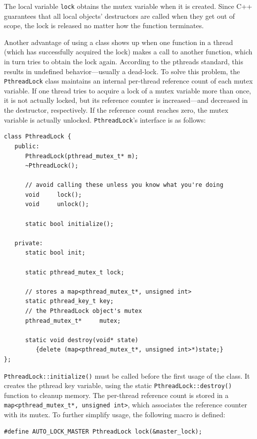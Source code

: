 The local variable \texttt{lock} obtains the mutex variable when it is
created. Since C++ guarantees that all local objects' destructors are called
when they get out of scope, the lock is released no matter how the function
terminates.

Another advantage of using a class shows up when one function in a thread
(which has successfully acquired the lock) makes a call to another function,
which in turn tries to obtain the lock again. According to the pthreads
standard, this results in undefined behavior---usually a dead-lock. To solve
this problem, the \texttt{PthreadLock} class maintains an internal per-thread
reference count of each mutex variable. If one thread tries to acquire a lock
of a mutex variable more than once, it is not actually locked, but its
reference counter is increased---and decreased in the destructor, respectively.
If the reference count reaches zero, the mutex variable is actually
unlocked. \texttt{PthreadLock}'s interface is as follows:

\begin{Verbatim}[fontsize=\small, frame=single]
class PthreadLock {
   public:
      PthreadLock(pthread_mutex_t* m);
      ~PthreadLock();

      // avoid calling these unless you know what you're doing
      void     lock();
      void     unlock();
      
      static bool initialize();
   
   private:
      static bool init;

      static pthread_mutex_t lock;

      // stores a map<pthread_mutex_t*, unsigned int>
      static pthread_key_t key; 
      // the PthreadLock object's mutex
      pthread_mutex_t*     mutex;
      
      static void destroy(void* state)
         {delete (map<pthread_mutex_t*, unsigned int>*)state;}
};
\end{Verbatim}

\texttt{PthreadLock::initialize()} must be called before the first usage of
the class. It creates the pthread key variable, using the static
\texttt{PthreadLock::\-destroy()} function to cleanup memory. The per-thread
reference count is stored in a \texttt{map<pthread\_mutex\_t*, unsigned int>},
which associates the reference counter with its mutex. To further simplify
usage, the following macro is defined:

\begin{Verbatim}[fontsize=\small, frame=single]
#define AUTO_LOCK_MASTER PthreadLock lock(&master_lock);
\end{Verbatim}

